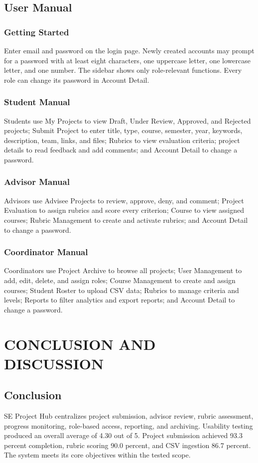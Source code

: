 \documentclass[12pt,a4paper]{report}
\begin{document}
\clearpage\section{User Manual}
\subsection{Getting Started}
Enter email and password on the login page. Newly created accounts may prompt for a password with at least eight characters, one uppercase letter, one lowercase letter, and one number. The sidebar shows only role-relevant functions. Every role can change its password in Account Detail.
\subsection{Student Manual}
Students use My Projects to view Draft, Under Review, Approved, and Rejected projects; Submit Project to enter title, type, course, semester, year, keywords, description, team, links, and files; Rubrics to view evaluation criteria; project details to read feedback and add comments; and Account Detail to change a password.
\subsection{Advisor Manual}
Advisors use Advisee Projects to review, approve, deny, and comment; Project Evaluation to assign rubrics and score every criterion; Course to view assigned courses; Rubric Management to create and activate rubrics; and Account Detail to change a password.
\subsection{Coordinator Manual}
Coordinators use Project Archive to browse all projects; User Management to add, edit, delete, and assign roles; Course Management to create and assign courses; Student Roster to upload CSV data; Rubrics to manage criteria and levels; Reports to filter analytics and export reports; and Account Detail to change a password.

\clearpage\chapter{CONCLUSION AND DISCUSSION}
\section{Conclusion}
SE Project Hub centralizes project submission, advisor review, rubric assessment, progress monitoring, role-based access, reporting, and archiving. Usability testing produced an overall average of 4.30 out of 5. Project submission achieved 93.3 percent completion, rubric scoring 90.0 percent, and CSV ingestion 86.7 percent. The system meets its core objectives within the tested scope.
\end{document}

